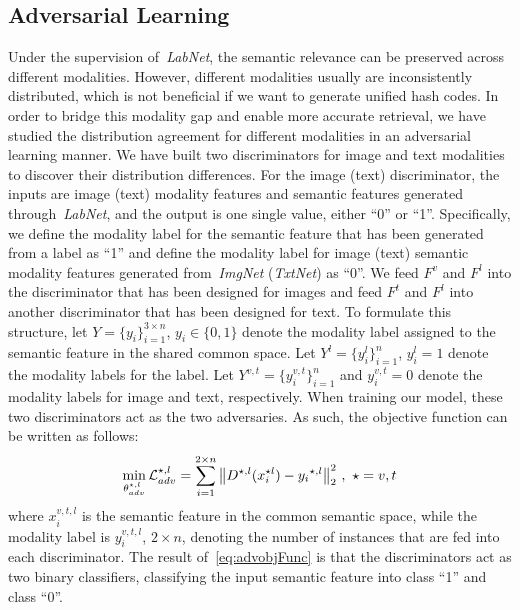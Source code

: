 \documentclass[10pt,twocolumn,letterpaper]{article}
\begin{document}
\subsection{Adversarial Learning}
\vspace{-0.15cm}
Under the supervision of~\emph{LabNet}, the semantic relevance can be preserved across different modalities. However, different modalities usually are inconsistently distributed, which is not beneficial if we want to generate unified hash codes. In order to bridge this modality gap and enable more accurate retrieval, we have studied the distribution agreement for different modalities in an adversarial learning manner. We have built two discriminators for image and text modalities to discover their distribution differences. For the image (text) discriminator, the inputs are image (text) modality features and semantic features generated through~\emph{LabNet}, and the output is one single value, either ``0'' or ``1''. Specifically, we define the modality label for the semantic feature that has been generated from a label as ``1'' and define the modality label for image (text) semantic modality features generated from~\emph{ImgNet} (\emph{TxtNet}) as ``0''. We feed $F^{v}$ and $F^{l}$ into the discriminator that has been designed for images and feed $F^{t}$ and $F^{l}$ into another discriminator that has been designed for text. To formulate this structure, let $Y=\{y_{i}\}_{i=1}^{3\times n}$, $y_{i}\in \{ 0, 1\}$ denote the modality label assigned to the semantic feature in the shared common space. Let $Y^{l}=\{y_{i}^{l}\}_{i=1}^{n}$, $y_{i}^{l}=1$ denote the modality labels for the label. Let $Y^{v,t}=\{y_{i}^{v,t}\}_{i=1}^{n}$ and $y_{i}^{v,t}=0$ denote the modality labels for image and text, respectively. When training our model, these two discriminators act as the two adversaries. As such, the objective function can be written as follows:
\vspace{-0.25cm}
\begin{equation}
\label{eq:advobjFunc}
\min\limits_{\theta_{adv}^{\star,l}}\mathcal{L}_{adv}^{\star,l} =  \sum _{ i=1 }^{ 2\times n }{ { {\left\| { D^{\star,l}({ x }_{ i }^{ \star l })}-{y_{i}}^{\star,l} \right\|  }_{2}^{2} } } \ , \ \star = v,t
\vspace{-0.25cm}
\end{equation}
where $x_{i}^{v,t,l}$ is the semantic feature in the common semantic space, while the modality label is $y_{i}^{v,t,l}$, $2\times n$, denoting the number of instances that are fed into each discriminator. The result of~\eqref{eq:advobjFunc} is that the discriminators act as two binary classifiers, classifying the input semantic feature into class ``1'' and class ``0''.
\end{document}
